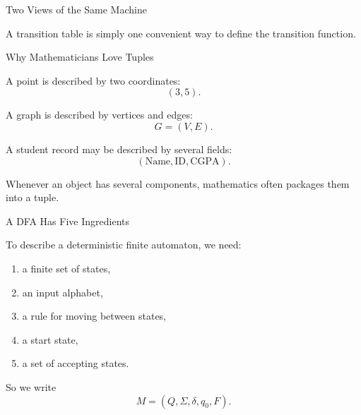 \documentclass[10pt,aspectratio=169]{beamer}
\newcommand{\dfa}{M=(Q,\Sigma,\delta,q_0,F)}
\begin{document}
\begin{frame}{Two Views of the Same Machine}

\begin{center}
\end{center}

\vspace{1em}

A transition table is simply one convenient way to define the transition function.

\end{frame}

\begin{frame}{Why Mathematicians Love Tuples}

A point is described by two coordinates:
\[
(3,5).
\]

\pause

A graph is described by vertices and edges:
\[
G=(V,E).
\]

\pause

A student record may be described by several fields:
\[
(\text{Name},\text{ID},\text{CGPA}).
\]

\pause

Whenever an object has several components, mathematics often packages them into a tuple.

\end{frame}

\begin{frame}{A DFA Has Five Ingredients}

To describe a deterministic finite automaton, we need:

\pause

\begin{enumerate}
\item a finite set of states,
\pause
\item an input alphabet,
\pause
\item a rule for moving between states,
\pause
\item a start state,
\pause
\item a set of accepting states.
\end{enumerate}

\pause

So we write
\[
\dfa.
\]

\end{frame}
\end{document}
